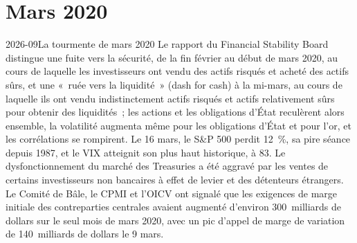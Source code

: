 \section{Mars 2020}

\begin{dated}{2026-09}{La tourmente de mars 2020}\label{dat:m3:when-markets-break-together:2020}
Le rapport du Financial Stability Board distingue une fuite vers la sécurité, de la fin février au début de mars 2020, au cours de laquelle les investisseurs ont vendu des actifs risqués et
acheté des actifs sûrs, et une «~ruée vers la liquidité~» (dash for cash) à la mi-mars, au cours de laquelle ils ont vendu indistinctement actifs risqués et actifs relativement sûrs pour obtenir des liquidités~; les actions et les obligations d'État
reculèrent alors ensemble, la volatilité augmenta même pour les obligations d'État et pour l'or, et les corrélations se rompirent. Le 16 mars, le S\&P 500 perdit 12~\%, sa pire
séance depuis 1987, et le VIX atteignit son plus haut historique, à 83. Le dysfonctionnement du marché des Treasuries a été aggravé par les ventes de certains investisseurs non bancaires
à effet de levier et des détenteurs étrangers. Le Comité de Bâle, le CPMI et l'OICV ont signalé que les exigences de marge initiale des contreparties centrales avaient augmenté d'environ
300~milliards de dollars sur le seul mois de mars 2020, avec un pic d'appel de marge de variation de 140~milliards de dollars le 9 mars.
\end{dated}

